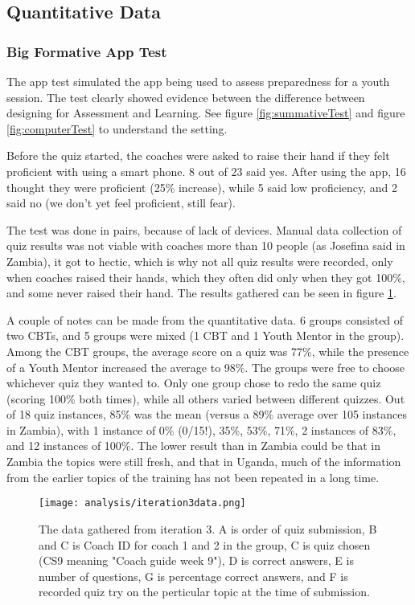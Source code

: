 \subsection{Quantitative Data}


    \subsubsection{Big Formative App Test}
  The app test simulated the app being used to assess preparedness for a youth session. The test clearly showed evidence between the difference between designing for Assessment and Learning. See figure \ref{fig:summativeTest} and figure \ref{fig:computerTest} to understand the setting.

  Before the quiz started, the coaches were asked to raise their hand if they felt proficient with using a smart phone. 8 out of 23 said yes. After using the app, 16 thought they were proficient (25\% increase), while 5 said low proficiency, and 2 said no (we don't yet feel proficient, still fear).

  The test was done in pairs, because of lack of devices. Manual data collection of quiz results was not viable with coaches more than 10 people (as Josefina said in Zambia), it got to hectic, which is why not all quiz results were recorded, only when coaches raised their hands, which they often did only when they got 100\%, and some never raised their hand. The results gathered can be seen in figure \ref{fig:iteration3data}.

  A couple of notes can be made from the quantitative data. 6 groups consisted of two CBTs, and 5 groups were mixed (1 CBT and 1 Youth Mentor in the group). Among the CBT groups, the average score on a quiz was 77\%, while the presence of a Youth Mentor increased the average to 98\%. The groups were free to choose whichever quiz they wanted to. Only one group chose to redo the same quiz (scoring 100\% both times), while all others varied between different quizzes. Out of 18 quiz instances, 85\% was the mean (versus a 89\% average over 105 instances in Zambia), with 1 instance of 0\% (0/15!), 35\%, 53\%, 71\%, 2 instances of 83\%, and 12 instances of 100\%. The lower result than in Zambia could be that in Zambia the topics were still fresh, and that in Uganda, much of the information from the earlier topics of the training has not been repeated in a long time.

  \begin{figure}[h]
    \centering
    \texttt{[image: analysis/iteration3data.png]}
    \caption{The data gathered from iteration 3. A is order of quiz submission, B and C is Coach ID for coach 1 and 2 in the group, C is quiz chosen (CS9 meaning "Coach guide week 9"), D is correct answers, E is number of questions, G is percentage correct answers, and F is recorded quiz try on the perticular topic at the time of submission.}
    \label{fig:iteration3data}
  \end{figure}

